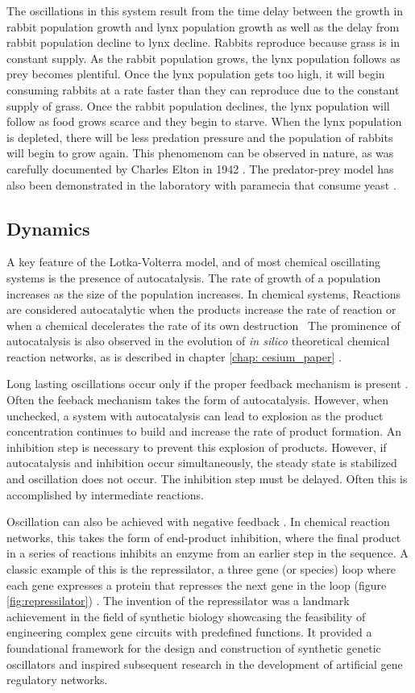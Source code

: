 \documentclass[12pt]{report}
\begin{document}
The oscillations in this system result from the time delay between the growth in rabbit population growth and lynx population growth as well as the delay from rabbit population decline to lynx decline. Rabbits reproduce because grass is in constant supply. As the rabbit population grows, the lynx population follows as prey becomes plentiful. Once the lynx population gets too high, it will begin consuming rabbits at a rate faster than they can reproduce due to the constant supply of grass. Once the rabbit population declines, the lynx population will follow as food grows scarce and they begin to starve. When the lynx population is depleted, there will be less predation pressure and the population of rabbits will begin to grow again. This phenomenom can be observed in nature, as was carefully documented by Charles Elton in 1942 \cite{Elton1942}. The predator-prey model has also been demonstrated in the laboratory with paramecia that consume yeast \cite{Gause}.


\subsection{Dynamics}
A key feature of the Lotka-Volterra model, and of most chemical oscillating systems is the presence of autocatalysis. The rate of growth of a population increases as the size of the population increases. In chemical systems, Reactions are considered autocatalytic when the products increase the rate of reaction or when a chemical decelerates the rate of its own destruction~\cite{Tyson2004}
The prominence of autocatalysis is also observed in the evolution of \textit{in silico} theoretical chemical reaction networks, as is described in chapter \ref{chap: cesium_paper} \cite{Tatka2023}. 

Long lasting oscillations occur only if the proper feedback mechanism is present \cite{Sharma2006}. Often the feeback mechanism takes the form of autocatalysis. However, when unchecked, a system with autocatalysis can lead to explosion as the product concentration continues to build and increase the rate of product formation. An inhibition step is necessary to prevent this explosion of products. However, if autocatalysis and inhibition occur simultaneously, the steady state is stabilized and oscillation does not occur. The inhibition step must be delayed. Often this is accomplished by intermediate reactions. 

Oscillation can also be achieved with negative feedback \cite{Tyson1975, Sauro_dynamics}. In chemical reaction networks, this takes the form of end-product inhibition, where the final product in a series of reactions inhibits an enzyme from an earlier step in the sequence. A classic example of this is the repressilator, a three gene (or species) loop where each gene expresses a protein that represses the next gene in the loop (figure \ref{fig:repressilator}) \cite{Elowitz2000}. The invention of the repressilator was a landmark achievement in the field of synthetic biology showcasing the feasibility of engineering complex gene circuits with predefined functions. It provided a foundational framework for the design and construction of synthetic genetic oscillators and inspired subsequent research in the development of artificial gene regulatory networks.
\end{document}
